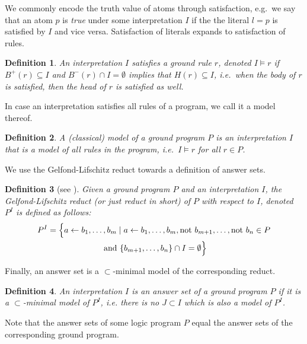 \documentclass[final]{vutinfth} %
\newtheorem{definition}{Definition}[chapter]
\newcommand{\headf}{H}
\newcommand{\bodyf}{B}
\newcommand{\fail}{\mathrm{not } \ \xspace}
\newcommand{\from}{\ensuremath{\leftarrow}}
\begin{document}
We commonly encode the truth value of atoms through satisfaction, e.g.~we say that an atom $p$ is \emph{true} under some interpretation $I$ if the the literal $l = p$ is satisfied by $I$ and vice versa. Satisfaction of literals expands to satisfaction of rules.%

\begin{definition}
\label{def:rule-model}
An interpretation $I$ \emph{satisfies} a ground rule $r$, denoted $I \models r$ if $\bodyf^+(r) \subseteq I$ and $\bodyf^-(r) \cap I = \emptyset$ implies that $\headf(r) \subseteq I$, i.e.~when the body of $r$ is satisfied, then the head of $r$ is satisfied as well.
\end{definition}

In case an interpretation satisfies all rules of a program, we call it a model thereof.

\begin{definition}
A \emph{(classical) model} of a ground program $P$ is an interpretation $I$ that is a model of all rules in the program, i.e.~$I \models r$ for all $r \in P$.
\end{definition}

We use the Gelfond-Lifschitz reduct towards a definition of answer sets.

\begin{definition}[see {\cite[Section 2]{stable}}]
	Given a ground program $P$ and an interpretation $I$, the \emph{Gelfond-Lifschitz reduct} (or just \emph{reduct} in short) of $P$ with respect to $I$, denoted $P^I$ is defined as follows:
\begin{multline*}
P^I = \Bigl\{ a \from b_1, \ldots , b_m \mid a \from b_1, \ldots, b_m, \fail b_{m+1}, \ldots, \fail b_n \in P\\ \text{ and } \{ b_{m+1} , \ldots , b_n \} \cap I = \emptyset \Bigr\}
\end{multline*}
\end{definition}

Finally, an answer set is a $\subset$-minimal model of the corresponding reduct.

\begin{definition}
An interpretation $I$ is an \emph{answer set} of a ground program $P$ if it is a $\subset$-minimal model of $P^I$, i.e. there is no $J \subset I$ which is also a model of $P^I$.
\end{definition}

Note that the answer sets of some logic program $P$ equal the answer sets of the corresponding ground program.
\end{document}
